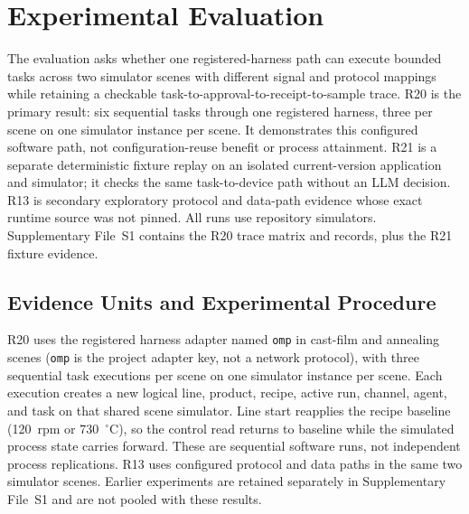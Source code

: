 \section{Experimental Evaluation}
\label{sec:eval}
The evaluation asks whether one registered-harness path can execute bounded
tasks across two simulator scenes with different signal and protocol mappings
while retaining a checkable task-to-approval-to-receipt-to-sample trace. R20 is
the primary result: six sequential tasks through one registered harness, three
per scene on one simulator instance per scene. It demonstrates this configured
software path, not configuration-reuse benefit or process attainment. R21 is a
separate deterministic fixture replay on an isolated current-version
application and simulator; it checks the same task-to-device path without an
LLM decision. R13 is secondary exploratory protocol and data-path evidence
whose exact runtime source was not pinned. All runs use repository simulators.
Supplementary File~S1 contains the R20 trace matrix and records, plus the R21
fixture evidence.

\subsection{Evidence Units and Experimental Procedure}
\label{sec:testbed}
\label{sec:procedure}
R20 uses the registered harness adapter named \texttt{omp} in cast-film and annealing scenes
(\texttt{omp} is the project adapter key, not a network protocol),
with three sequential task executions per scene on one simulator instance per
scene. Each execution creates a new logical line, product, recipe, active run,
channel, agent, and task on that shared scene simulator. Line start reapplies the recipe baseline
(120~rpm or 730~$^{\circ}$C), so the control read returns to baseline while
the simulated process state carries forward. These are sequential software
runs, not independent process replications. R13 uses configured protocol and
data paths in the same two simulator scenes. Earlier experiments are retained
separately in Supplementary File~S1 and are not pooled with these results.

